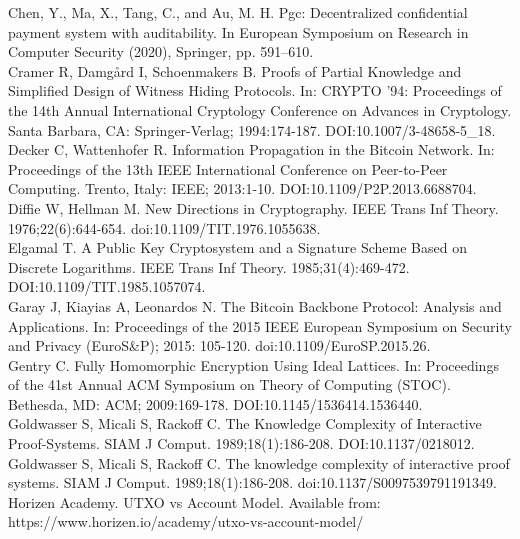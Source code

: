 \documentclass[12pt,a4paper,twocolumn]{article}
\begin{document}
Chen, Y., Ma, X., Tang, C., and Au, M. H. Pgc: Decentralized confidential payment system with auditability. In European Symposium on Research in Computer Security (2020), Springer, pp. 591–610.\\

Cramer R, Damgård I, Schoenmakers B. Proofs of Partial Knowledge and Simplified Design of Witness Hiding Protocols. In: CRYPTO '94: Proceedings of the 14th Annual International Cryptology Conference on Advances in Cryptology. Santa Barbara, CA: Springer-Verlag; 1994:174-187. DOI:10.1007/3-48658-5\_18.\\

Decker C, Wattenhofer R. Information Propagation in the Bitcoin Network. In: Proceedings of the 13th IEEE International Conference on Peer-to-Peer Computing. Trento, Italy: IEEE; 2013:1-10. DOI:10.1109/P2P.2013.6688704.\\

Diffie W, Hellman M. New Directions in Cryptography. IEEE Trans Inf Theory. 1976;22(6):644-654. doi:10.1109/TIT.1976.1055638.\\

Elgamal T. A Public Key Cryptosystem and a Signature Scheme Based on Discrete Logarithms. IEEE Trans Inf Theory. 1985;31(4):469-472. DOI:10.1109/TIT.1985.1057074.\\

Garay J, Kiayias A, Leonardos N. The Bitcoin Backbone Protocol: Analysis and Applications. In: Proceedings of the 2015 IEEE European Symposium on Security and Privacy (EuroS\&P); 2015: 105-120. doi:10.1109/EuroSP.2015.26.\\

Gentry C. Fully Homomorphic Encryption Using Ideal Lattices. In: Proceedings of the 41st Annual ACM Symposium on Theory of Computing (STOC). Bethesda, MD: ACM; 2009:169-178. DOI:10.1145/1536414.1536440.\\

Goldwasser S, Micali S, Rackoff C. The Knowledge Complexity of Interactive Proof-Systems. SIAM J Comput. 1989;18(1):186-208. DOI:10.1137/0218012.\\

Goldwasser S, Micali S, Rackoff C. The knowledge complexity of interactive proof systems. SIAM J Comput. 1989;18(1):186-208. doi:10.1137/S0097539791191349.\\

Horizen Academy. UTXO vs Account Model. Available from: https://www.horizen.io/academy/utxo-vs-account-model/ \\
\end{document}

